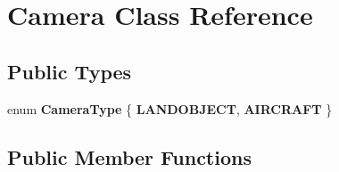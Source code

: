 \hypertarget{class_camera}{\section{Camera Class Reference}
\label{class_camera}
}
\subsection*{Public Types}
\begin{DoxyCompactItemize}
\item 
enum {\bfseries Camera\-Type} \{ {\bfseries L\-A\-N\-D\-O\-B\-J\-E\-C\-T}, 
{\bfseries A\-I\-R\-C\-R\-A\-F\-T}
 \}
\end{DoxyCompactItemize}
\subsection*{Public Member Functions}
